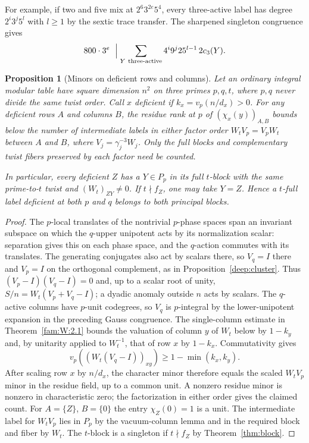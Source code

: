 \documentclass[11pt,a4paper]{article}
\numberwithin{equation}{section}
\newtheorem{proposition}[theorem]{Proposition}
\theoremstyle{remark}
\begin{document}
For example, if two and five mix at $2^6 3^{2e}5^4$, every
three-active label has degree $2^i3^j5^l$ with $l\ge1$ by the
sextic trace transfer. The sharpened singleton congruence gives
\[
 800\cdot3^e\ \Bigm|\sum_{Y\ {\rm three\text{-}active}}
       4^i9^j25^{l-1}\,2c_3(Y).
\]
\begin{proposition}[Minors on deficient rows and columns]\label{u2:deficient-minors}
Let an ordinary integral modular table have square dimension $n^2$ on
three primes $p,q,t$, where $p,q$ never divide the same twist order.
Call $x$ deficient if $k_x=v_p(n/d_x)>0$. For any deficient rows $A$
and columns $B$, the residue rank at $p$ of $(\chi_x(y))_{A,B}$
bounds below the number of intermediate labels in either factor
order $W_t V_p=V_p W_t$ between $A$ and $B$, where
$V_j=\gamma_j^{-3}W_j$. Only the full blocks and complementary
twist fibers preserved by each factor need be counted.

In particular, every deficient $Z$ has a $Y\in P_p$ in its full
$t$-block with the same prime-to-$t$ twist and $(W_t)_{ZY}\ne0$.
If $t\nmid f_Z$, one may take $Y=Z$. Hence a $t$-full label deficient
at both $p$ and $q$ belongs to both principal blocks.
\end{proposition}
\begin{proof}
The $p$-local translates of the nontrivial $p$-phase spaces span
an invariant subspace on which the $q$-upper unipotent acts by its
normalization scalar: separation gives this on each phase space,
and the $q$-action commutes with its translates. The generating
conjugates also act by scalars there, so $V_q=I$ there and $V_p=I$
on the orthogonal complement, as in Proposition~\ref{deep:cluster}.
Thus $(V_p-I)(V_q-I)=0$ and, up to a scalar root of unity,
$S/n=W_t(V_p+V_q-I)$; a dyadic anomaly outside $n$ acts by scalars.
The $q$-active columns have $p$-unit codegrees, so $V_q$ is $p$-integral
by the lower-unipotent expansion in the preceding Gauss congruence.
The single-column estimate in Theorem~\ref{fam:W:2.1} bounds the
valuation of column $y$ of $W_t$ below by $1-k_y$ and, by unitarity
applied to $W_t^{-1}$, that of row $x$ by $1-k_x$. Commutativity gives
\[
 v_p((W_t(V_q-I))_{xy})\ge 1-\min(k_x,k_y).
\]
After scaling row $x$ by $n/d_x$, the character minor therefore
equals the scaled $W_t V_p$ minor in the residue field, up to a common
unit. A nonzero residue minor is nonzero in characteristic zero;
the factorization in either order gives the claimed count.
For $A=\{Z\}$, $B=\{0\}$ the entry $\chi_Z(0)=1$ is a unit. The
intermediate label for $W_t V_p$ lies in $P_p$ by the vacuum-column
lemma and in the required block and fiber by $W_t$. The $t$-block is
a singleton if $t\nmid f_Z$ by Theorem~\ref{thm:block}.
\end{proof}
\end{document}

